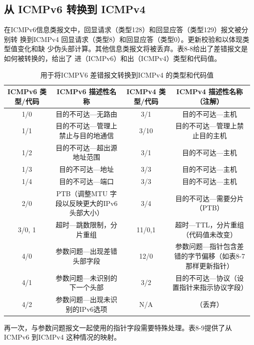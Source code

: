 \subsection{从 ICMPv6 转换到 ICMPv4}
在ICMPv6信息类报文中，回显请求（类型128）和回显应答（类型129）报文被分别转
换到ICMPv4 回显请求（类型8）和回显应答（类型0）。更新校验和以体现类型值变化和缺
少伪头部计算。其他信息类报文将被丢弃。表8-8给出了差错报文是如何被转换的，给出了
进（ICMPv6）和出（ICMPv4）类型和代码值。

\begin{table}[]
    \centering
    \caption{用于将ICMPV6 差错报文转换到ICMPv4 的类型和代码值}
    \begin{tabular}{c|c|c|c}
        \hline
		ICMPv6 类型/代码	&	ICMPv6 描述性名称	&	ICMPv4 类型/代码	&	ICMPv4 描述性名称（注解）    \\ \hline
		1/0 & 目的不可达---无路由 & 3/1 & 目的不可达---主机 \\ \hline
		1/1 & 目的不可达---管理上禁止与目的地通信 & 3/10 & 目的不可达---管理上禁止目的主机 \\ \hline
		1/2 & 目的不可达---超出源地址范围 & 3/1 & 目的不可达---主机 \\ \hline
		1/3 & 目的不可达---地址 & 3/3 & 目的不可达---主机 \\ \hline
		1/4 & 目的不可达---端口 & 3/3 & 目的不可达---主机\\ \hline
		2/0 & PTB（调整MTU 字段以反映更大的IPv6 头部大小） & 3/4 & 目的不可达---需要分片（PTB） \\ \hline
		3/{0, 1} & 超时---跳数限制，分片重组 & 11/{0,1} & 超时---TTL，分片重组（代码值未改变） \\ \hline
		4/0 & 参数问题---出现差错头部字段 & 12/0 & 参数问题—指针包含差错的字节偏移（如表8-7那样更新指针） \\ \hline
		4/1 & 参数问题---未识别的下一个头部 & 3/2 & 目的不可达---协议（设置指针来指示协议字段） \\ \hline
		4/2 & 参数问题---出现未识别的IPv6选项 & N/A & （丢弃） \\ \hline
    \end{tabular}
\end{table}

再一次，与参数问题报文一起使用的指针字段需要特殊处理。表8-9提供了从 ICMPv6
到ICMPv4 这种情况的映射。


